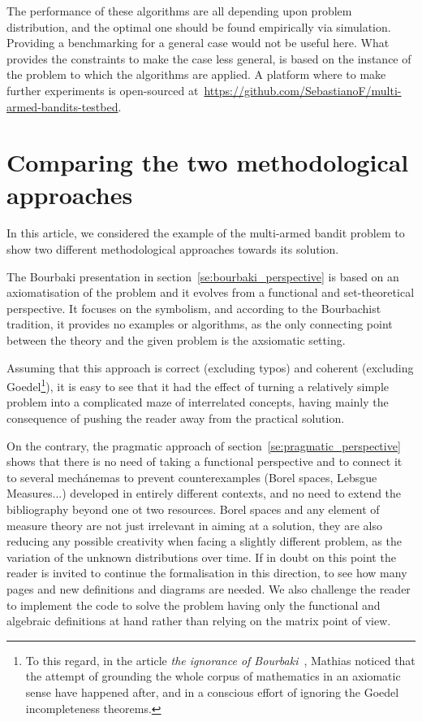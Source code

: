 \documentclass[]{scrartcl}
\theoremstyle{definition}
\begin{document}
The performance of these algorithms are all depending upon problem distribution, and the optimal one should be found empirically via simulation. Providing a benchmarking for a general case would not be useful here. What provides the constraints to make the case less general, is based on the instance of the problem to which the algorithms are applied. A platform where to make further experiments is open-sourced at~\href{https://github.com/SebastianoF/multi-armed-bandits-testbed}{https://github.com/SebastianoF/multi-armed-bandits-testbed}.


\section{Comparing the two methodological approaches}
\label{se:outro}

In this article, we considered the example of the multi-armed bandit problem to show two different methodological approaches towards its solution.

The Bourbaki presentation in section~\ref{se:bourbaki_perspective} is based on an axiomatisation of the problem and it evolves from a functional and set-theoretical perspective. It focuses on the symbolism, and according to the Bourbachist tradition, it provides no examples or algorithms, as the only connecting point between the theory and the given problem is the axsiomatic setting.

Assuming that this approach is correct (excluding typos) and coherent (excluding Goedel\footnote{
    To this regard, in the article \emph{the ignorance of Bourbaki}~\cite{mathias1992ignorance}, Mathias noticed that the attempt of grounding the whole corpus of mathematics in an axiomatic sense have happened after, and in a conscious effort of ignoring the Goedel incompleteness theorems.
}), it is easy to see that it had the effect of turning a relatively simple problem into a complicated maze of interrelated concepts, having mainly the consequence of pushing the reader away from the practical solution.

On the contrary, the pragmatic approach of section~\ref{se:pragmatic_perspective} shows that there is no need of taking a functional perspective and to connect it to several mechánemas to prevent counterexamples (Borel spaces, Lebsgue Measures...) developed in entirely different contexts, and no need to extend the bibliography beyond one ot two resources. Borel spaces and any element of measure theory are not just irrelevant in aiming at a solution, they are also reducing any possible creativity when facing a slightly different problem, as the variation of the unknown distributions over time. If in doubt on this point the reader is invited to continue the formalisation in this direction, to see how many pages and new definitions and diagrams are needed. We also challenge the reader to implement the code to solve the problem having only the functional and algebraic definitions at hand rather than relying on the matrix point of view.
\end{document}
